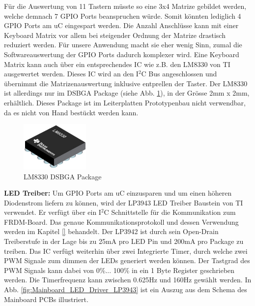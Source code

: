 Für die Auswertung von 11 Tastern müsste so eine 3x4 Matrize gebildet werden, welche demnach 7 GPIO Ports beanspruchen würde. Somit könnten lediglich 4 GPIO Ports am uC eingespart werden. Die Anzahl Anschlüsse kann mit einer Keyboard Matrix vor allem bei steigender Ordnung der Matrize drastisch reduziert werden. Für unsere Anwendung macht sie eher wenig Sinn, zumal die Softwareauswertung der GPIO Ports dadurch komplexer wird. Eine Keyboard Matrix kann auch über ein entsprechendes IC wie z.B. den LM8330 von TI ausgewertet werden. Dieses IC wird an den I$^2$C Bus angeschlossen und übernimmt die Matrizenauswertung inklusive entprellen der Taster. Der LM8330 ist allerdings nur im DSBGA Package (siehe Abb. \ref{fig:DSBGA_Package}), in der Grösse 2mm x 2mm, erhältlich. Dieses Package ist im Leiterplatten Prototypenbau nicht verwendbar, da es nicht von Hand bestückt werden kann.\newline

\begin{figure}[H]
	\includegraphics[width=0.3\textwidth]{Illustrationen/6-Umsetzung/DSBGA_Package.png}
	\caption{LM8330 DSBGA Package \protect\cite{DSBGA_Package}}
	\label{fig:DSBGA_Package}
\end{figure}

\textbf{LED Treiber:} Um GPIO Ports am uC einzusparen und um einen höheren Diodenstrom liefern zu können, wird der LP3943 LED Treiber Baustein von TI verwendet. Er verfügt über ein I$^{2}$C Schnittstelle für die Kommunikation zum FRDM-Board. Das genaue Kommunikationsprotokoll und dessen Verwendung werden im Kapitel \ref{} behandelt. Der LP3942 ist durch sein Open-Drain Treiberstufe in der Lage bis zu 25mA pro LED Pin und 200mA pro Package zu treiben. Das IC verfügt weiterhin über zwei Integrierte Timer, durch welche zwei PWM Signale zum dimmen der LEDs generiert werden können. Der Tastgrad des PWM Signals kann dabei von 0\%... 100\% in ein 1 Byte Register geschrieben werden. Die Timerfrequenz kann zwischen 0.625Hz und 160Hz gewählt werden. In Abb. \ref{fig:Mainboard_LED_Driver_LP3943} ist ein Auszug aus dem Schema des Mainboard PCBs illustriert. 

